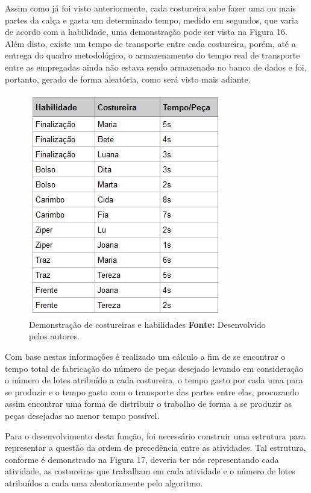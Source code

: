 \par Assim como já foi visto anteriormente, cada costureira sabe fazer uma ou
mais partes da calça e gasta um determinado tempo, medido em segundos, que varia de acordo com a habilidade, uma demonstração pode ser vista na 
Figura 16. Além disto, existe um tempo de transporte entre cada costureira,
porém, até a entrega do quadro metodológico, o armazenamento do tempo real de transporte entre as empregadas ainda não estava sendo armazenado no 
banco de dados e foi, portanto, gerado de forma aleatória, como será visto mais
adiante.


\begin{figure}[h!]
	\centerline{\includegraphics[scale=0.9]{./imagens/tempo_habilidade_3.PNG}}
	\caption[Demonstração de costureiras e habilidades]
	{Demonstração de costureiras e habilidades \textbf{Fonte:} Desenvolvido pelos
	autores.}
	\label{fig:exemplo1}
\end{figure}

\par Com base nestas informações é realizado um cálculo a fim de se encontrar o tempo total de fabricação do número de peças
desejado levando em consideração o número de lotes atribuído a cada costureira, o tempo gasto por cada uma para se produzir e 
o tempo gasto com o transporte das partes entre elas, procurando assim encontrar
uma forma de distribuir o trabalho de forma a se produzir as peças desejadas no menor tempo possível. 

\par Para o desenvolvimento desta função, foi necessário construir uma estrutura para representar a questão da ordem de 
precedência entre as atividades. Tal estrutura, conforme é demonstrado na Figura
17, deveria ter nós representando cada atividade, as costureiras que trabalham
em cada atividade e o número de lotes atribuídos a cada uma aleatoriamente pelo algoritmo.

